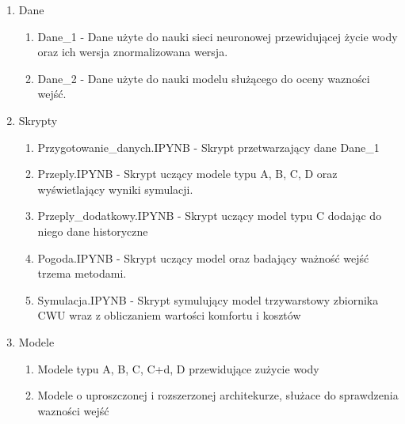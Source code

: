 \documentclass[a4paper,twoside,12pt]{book}
\begin{document}
\begin{appendices}
  \begin{enumerate}
    \item Dane
          \begin{enumerate}
            \item Dane\_1 - Dane użyte do nauki sieci neuronowej przewidującej życie wody oraz ich wersja znormalizowana wersja.
            \item Dane\_2 - Dane użyte do nauki modelu służącego do oceny wazności wejść.
          \end{enumerate}
    \item Skrypty
          \begin{enumerate}
            \item Przygotowanie\_danych.IPYNB - Skrypt przetwarzający dane Dane\_1
            \item Przeply.IPYNB - Skrypt uczący modele typu A, B, C, D oraz wyświetlający wyniki symulacji.
            \item Przeply\_dodatkowy.IPYNB - Skrypt uczący model typu C dodając do niego dane historyczne
            \item Pogoda.IPYNB - Skrypt uczący model oraz badający ważność wejść trzema metodami.
            \item Symulacja.IPYNB - Skrypt symulujący model trzywarstowy zbiornika CWU wraz z obliczaniem wartości komfortu i kosztów
          \end{enumerate}
    \item Modele
          \begin{enumerate}
            \item Modele typu A, B, C, C+d, D przewidujące zużycie wody
            \item Modele o uproszczonej i rozszerzonej architekurze, służace do sprawdzenia wazności wejść
          \end{enumerate}
  \end{enumerate}



  \listoffigures
  \listoftables

\end{appendices}
\end{document}
